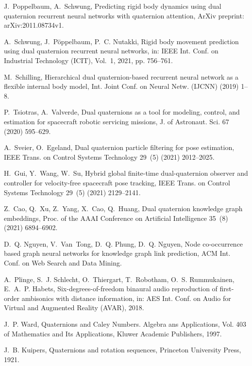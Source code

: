 \documentclass[3p, preprint, twocolumn]{elsarticle}
\begin{document}
\begin{thebibliography}{10}
J.~Poppelbaum, A.~Schwung, Predicting rigid body dynamics using dual quaternion
  recurrent neural networks with quaternion attention, ArXiv preprint:
  arXiv:2011.08734v1.

A.~Schwung, J.~Pöppelbaum, P.~C. Nutakki, Rigid body movement prediction using
  dual quaternion recurrent neural networks, in: {IEEE} Int. Conf. on
  Industrial Technology ({ICIT}), Vol.~1, 2021, pp. 756--761.

M.~Schilling, Hierarchical dual quaternion-based recurrent neural network as a
  flexible internal body model, Int. Joint Conf. on Neural Netw. (IJCNN) (2019)
  1--8.

P.~Tsiotras, A.~Valverde, Dual quaternions as a tool for modeling, control, and
  estimation for spacecraft robotic servicing missions, J. of Astronaut. Sci.
  67 (2020) 595–629.

A.~Sveier, O.~Egeland, Dual quaternion particle filtering for pose estimation,
  IEEE Trans. on Control Systems Technology 29~(5) (2021) 2012--2025.

H.~Gui, Y.~Wang, W.~Su, Hybrid global finite-time dual-quaternion observer and
  controller for velocity-free spacecraft pose tracking, IEEE Trans. on Control
  Systems Technology 29~(5) (2021) 2129--2141.

Z.~Cao, Q.~Xu, Z.~Yang, X.~Cao, Q.~Huang, Dual quaternion knowledge graph
  embeddings, Proc. of the {AAAI} Conference on Artificial Intelligence 35~(8)
  (2021) 6894--6902.

D.~Q. Nguyen, V.~Van~Tong, D.~Q. Phung, D.~Q. Nguyen, Node co-occurrence based
  graph neural networks for knowledge graph link prediction, {ACM} Int. Conf.
  on Web Search and Data Mining.

A.~Plinge, S.~J. Schlecht, O.~Thiergart, T.~Robotham, O.~S. Rummukainen,
  E.~A.~P. Habets, Six-degrees-of-freedom binaural audio reproduction of
  first-order ambisonics with distance information, in: {AES} Int. Conf. on
  Audio for Virtual and Augmented Reality ({AVAR}), 2018.

J.~P. Ward, Quaternions and Caley Numbers. Algebra ans Applications, Vol. 403
  of Mathematics and Its Applications, Kluwer Academic Publishers, 1997.

J.~B. Kuipers, Quaternions and rotation sequences, Princeton University Press,
  1921.


\end{thebibliography}
\end{document}
